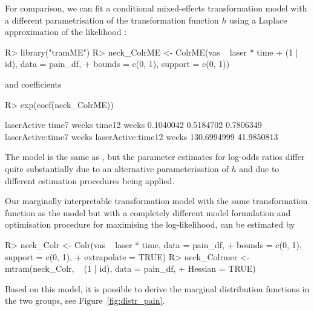 \documentclass[article,nojss,shortnames]{jss}\usepackage[]{graphicx}\usepackage[]{xcolor}
\newcommand{\h}{h}
\begin{document}
For comparison, we can fit a conditional mixed-effects transformation model with a different
parametrisation of the transformation function $\h$ using a Laplace
approximation of the likelihood \citep{Tamasi_Crowther_Puhan_2022}:
\begin{Schunk}
\begin{Sinput}
R> library("tramME")
R> neck_ColrME <- ColrME(vas ~ laser * time + (1 | id), data = pain_df, 
+                        bounds = c(0, 1), support = c(0, 1))
\end{Sinput}
\end{Schunk}
and coefficients
\begin{Schunk}
\begin{Sinput}
R> exp(coef(neck_ColrME))
\end{Sinput}
\begin{Soutput}
             laserActive              time7 weeks             time12 weeks 
               0.1040042                0.5184702                0.7806349 
 laserActive:time7 weeks laserActive:time12 weeks 
             130.6994999               41.9850813 
\end{Soutput}
\end{Schunk}
The model is the same as , but the parameter estimates for
log-odds ratios differ quite substantially due to an alternative
parameterisation of $\h$ and due to different estimation procedures being
applied.

Our marginally interpretable transformation model with the same
transformation function as the model  but with a completely 
different model formulation and optimisation procedure for maximising the log-likelihood, 
can be estimated by
\begin{Schunk}
\begin{Sinput}
R> neck_Colr <- Colr(vas ~ laser * time, data = pain_df, 
+                    bounds = c(0, 1), support = c(0, 1),
+                    extrapolate = TRUE)
R> neck_Colrmer <- mtram(neck_Colr, ~ (1 | id), data = pain_df, 
+                        Hessian = TRUE)
\end{Sinput}
\end{Schunk}
Based on this model, it is possible to derive the marginal 
distribution functions in the two groups, see Figure~\ref{fig:distr_pain}.
\end{document}
